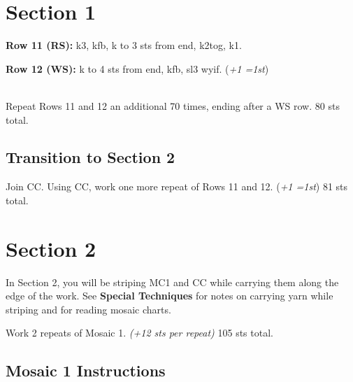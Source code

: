 \documentclass[12pt]{article}
\newcommand{\rowDir}[1]{\textbf{#1:}} %
\newcommand{\increase}[1]{(\emph{+#1 
	\ifnum#1=1{st}\else{sts}\fi})}
\begin{document}
\section*{Section 1}

\rowDir{Row 11 (RS)} k3, kfb, k to 3 sts from end, k2tog, k1.

\rowDir{Row 12 (WS)} k to 4 sts from end, kfb, sl3 wyif. \increase{1}

~\\
Repeat Rows 11 and 12 an additional 70 times, ending after a WS row. 80 sts total.

\subsection*{Transition to Section 2}

Join CC. Using CC, work one more repeat of Rows 11 and 12. \increase{1} 81 sts total.


\section*{Section 2}

In Section 2, you will be striping MC1 and CC while carrying them along the edge of the work. See \textbf{Special Techniques} for notes on carrying yarn while striping and for reading mosaic charts.

\newpage
Work 2 repeats of Mosaic 1. \emph{(+12 sts per repeat)} 105 sts total.

\subsection*{Mosaic 1 Instructions}
\end{document}
